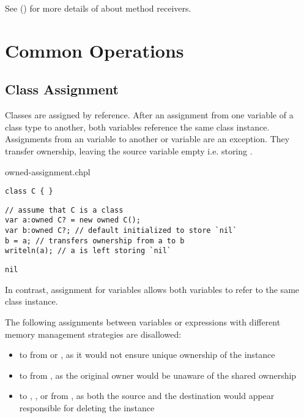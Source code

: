 See () for more details of about method
receivers.

\section{Common Operations}

\subsection{Class Assignment}
\label{Class_Assignment}

Classes are assigned by reference.  After an assignment from one
variable of a class type to another, both variables reference the same
class instance. Assignments from an  variable to another
 or  variable are an exception. They transfer
ownership, leaving the source variable empty i.e. storing .

\begin{chapelexample}{owned-assignment.chpl}
\begin{chapelpre}
\begin{verbatim}
class C { }
\end{verbatim}
\end{chapelpre}
\begin{chapel}
\begin{verbatim}
// assume that C is a class
var a:owned C? = new owned C();
var b:owned C?; // default initialized to store `nil`
b = a; // transfers ownership from a to b
writeln(a); // a is left storing `nil`
\end{verbatim}
\end{chapel}
\begin{chapeloutput}
\begin{verbatim}
nil
\end{verbatim}
\end{chapeloutput}
\end{chapelexample}

In contrast, assignment for  variables allows both
variables to refer to the same class instance.

The following assignments between variables or expressions with different
memory management strategies are disallowed:

\begin{itemize}
\item to  from  or ,
      as it would not ensure unique ownership of the instance

\item to  from , as the original owner
      would be unaware of the shared ownership

\item to , , or  from ,
      as both the source and the destination would appear responsible
      for deleting the instance
\end{itemize}

